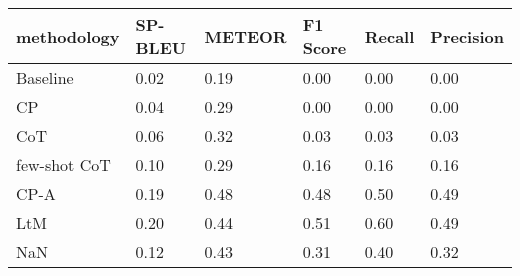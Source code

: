 \begin{tabular}{llllll}
\toprule
methodology & SP-BLEU & METEOR & F1 Score & Recall & Precision \\
\midrule
Baseline & 0.02 & 0.19 & 0.00 & 0.00 & 0.00 \\
CP & 0.04 & 0.29 & 0.00 & 0.00 & 0.00 \\
CoT & 0.06 & 0.32 & 0.03 & 0.03 & 0.03 \\
few-shot CoT & 0.10 & 0.29 & 0.16 & 0.16 & 0.16 \\
CP-A & 0.19 & 0.48 & 0.48 & 0.50 & 0.49 \\
LtM & 0.20 & 0.44 & 0.51 & 0.60 & 0.49 \\
NaN & 0.12 & 0.43 & 0.31 & 0.40 & 0.32 \\
\bottomrule
\end{tabular}
